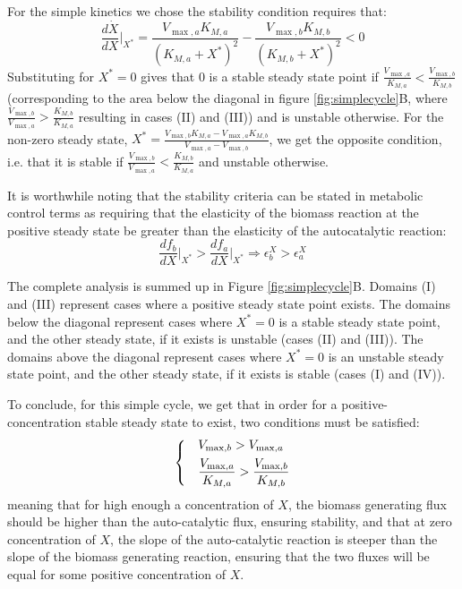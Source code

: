 \documentclass[a4page,notitlepage]{article}
\begin{document}
    For the simple kinetics we chose the stability condition requires that:
    \begin{equation*}
      \frac{d\dot X}{dX}\Big\vert_{X^*} = \frac{V_{\max,a}K_{M,a}}{(K_{M,a}+X^*)^2}-\frac{V_{\max,b}K_{M,b}}{(K_{M,b}+X^*)^2}<0
    \end{equation*}
    Substituting for $X^*=0$ gives that $0$ is a stable steady state point if $\frac{V_{\max,a}}{K_{M,a}}<\frac{V_{\max,b}}{K_{M,b}}$ (corresponding to the area below the diagonal in figure \ref{fig:simplecycle}B, where $\frac{V_{\max,b}}{V_{\max,a}}>\frac{K_{M,b}}{K_{M,a}}$ resulting in cases (II) and (III)) and is unstable otherwise.
    For  the non-zero steady state, $X^*=\frac{V_{\max,b}K_{M,a}-V_{\max,a}K_{M,b}}{V_{\max,a}-V_{\max,b}}$, we get the opposite condition, i.e. that it is stable if $\frac{V_{\max,b}}{V_{\max,a}}<\frac{K_{M,b}}{K_{M,a}}$ and unstable otherwise.

    It is worthwhile noting that the stability criteria can be stated in metabolic control terms \cite{Fell1997} as requiring that the elasticity of the biomass reaction at the positive steady state be greater than the elasticity of the autocatalytic reaction:
    \begin{equation*}
      \frac{df_b}{dX}\Big\vert_{X^*}>\frac{df_a}{dX}\Big\vert_{X^*} \Rightarrow \epsilon^X_b>\epsilon^X_a
    \end{equation*}
    
    The complete analysis is summed up in Figure \ref{fig:simplecycle}B.
    Domains (I) and (III) represent cases where a positive steady state point exists.
    The domains below the diagonal represent cases where $X^*=0$ is a stable steady state point, and the other steady state, if it exists is unstable (cases (II) and (III)).
    The domains above the diagonal represent cases where $X^*=0$ is an unstable steady state point, and the other steady state, if it exists is stable (cases (I) and (IV)).

    To conclude, for this simple cycle, we get that in order for a positive-concentration stable steady state to exist, two conditions must be satisfied:
    \begin{equation}
    \label{eq:stabconds}
    \begin{dcases}
      & V_{\max,b}>V_{\max,a} \\
      & \frac{V_{\max,a}}{K_{M,a}}>\frac{V_{\max,b}}{K_{M,b}}
    \end{dcases}
    \end{equation}
    meaning that for high enough a concentration of $X$, the biomass generating flux should be higher than the auto-catalytic flux, ensuring stability, and that at zero concentration of $X$, the slope of the auto-catalytic reaction is steeper than the slope of the biomass generating reaction, ensuring that the two fluxes will be equal for some positive concentration of $X$.
\end{document}
